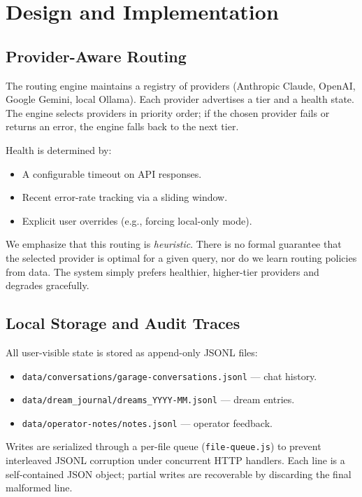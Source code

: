\documentclass{article}
\begin{document}
\section{Design and Implementation}

\subsection{Provider-Aware Routing}

The routing engine maintains a registry of providers (Anthropic Claude, OpenAI,
Google Gemini, local Ollama). Each provider advertises a tier and a health
state. The engine selects providers in priority order; if the chosen provider
fails or returns an error, the engine falls back to the next tier.

Health is determined by:
\begin{itemize}
    \item A configurable timeout on API responses.
    \item Recent error-rate tracking via a sliding window.
    \item Explicit user overrides (e.g., forcing local-only mode).
\end{itemize}

We emphasize that this routing is \emph{heuristic}. There is no formal
guarantee that the selected provider is optimal for a given query, nor do we
learn routing policies from data. The system simply prefers healthier,
higher-tier providers and degrades gracefully.

\subsection{Local Storage and Audit Traces}

All user-visible state is stored as append-only JSONL files:
\begin{itemize}
    \item \texttt{data/conversations/garage-conversations.jsonl} --- chat
    history.
    \item \texttt{data/dream\_journal/dreams\_YYYY-MM.jsonl} --- dream entries.
    \item \texttt{data/operator-notes/notes.jsonl} --- operator feedback.
\end{itemize}

Writes are serialized through a per-file queue (\texttt{file-queue.js}) to
prevent interleaved JSONL corruption under concurrent HTTP handlers. Each line
is a self-contained JSON object; partial writes are recoverable by discarding
the final malformed line.
\end{document}
